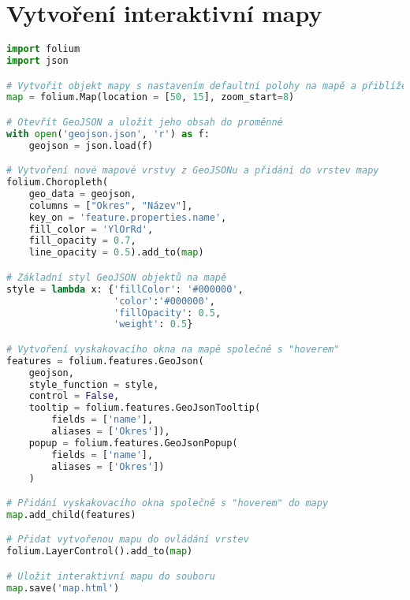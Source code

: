 \chapter{Vytvoření interaktivní mapy}

\begin{lstlisting}[language=Python,label=src:CreateMapFolium,caption={Vytvoření interaktivní mapy pomocí Folium}]
import folium
import json

# Vytvořit objekt mapy s nastavením defaultní polohy na mapě a přiblížením
map = folium.Map(location = [50, 15], zoom_start=8)

# Otevřít GeoJSON a uložit jeho obsah do proměnné
with open('geojson.json', 'r') as f:
    geojson = json.load(f)

# Vytvoření nové mapové vrstvy z GeoJSONu a přidání do vrstev mapy
folium.Choropleth(
    geo_data = geojson,
    columns = ["Okres", "Název"],
    key_on = 'feature.properties.name',
    fill_color = 'YlOrRd',
    fill_opacity = 0.7,
    line_opacity = 0.5).add_to(map)

# Základní styl GeoJSON objektů na mapě
style = lambda x: {'fillColor': '#000000', 
                   'color':'#000000', 
                   'fillOpacity': 0.5, 
                   'weight': 0.5}

# Vytvoření vyskakovacího okna na mapě společně s "hoverem"
features = folium.features.GeoJson(
    geojson,
    style_function = style, 
    control = False,
    tooltip = folium.features.GeoJsonTooltip(
        fields = ['name'],
        aliases = ['Okres']),
    popup = folium.features.GeoJsonPopup(
        fields = ['name'],
        aliases = ['Okres'])
    )

# Přidání vyskakovacího okna společně s "hoverem" do mapy
map.add_child(features)

# Přidat vytvořenou mapu do ovládání vrstev
folium.LayerControl().add_to(map)

# Uložit interaktivní mapu do souboru
map.save('map.html')
\end{lstlisting}

\endinput
